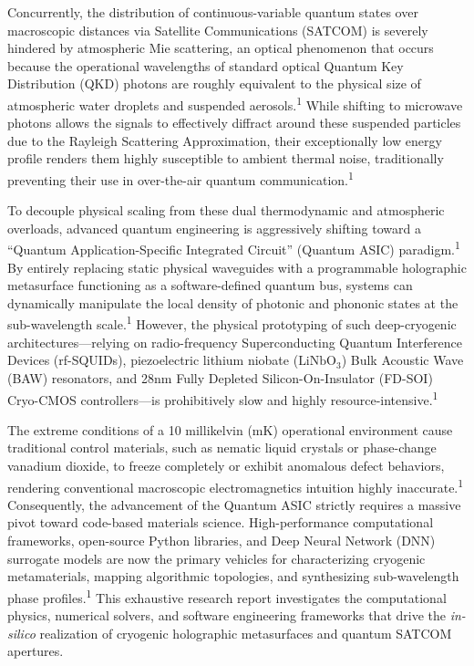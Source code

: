 \documentclass[11pt, a4paper]{article}
\begin{document}
Concurrently, the distribution of continuous-variable quantum states over macroscopic distances via Satellite Communications (SATCOM) is severely hindered by atmospheric Mie scattering, an optical phenomenon that occurs because the operational wavelengths of standard optical Quantum Key Distribution (QKD) photons are roughly equivalent to the physical size of atmospheric water droplets and suspended aerosols.\textsuperscript{1} While shifting to microwave photons allows the signals to effectively diffract around these suspended particles due to the Rayleigh Scattering Approximation, their exceptionally low energy profile renders them highly susceptible to ambient thermal noise, traditionally preventing their use in over-the-air quantum communication.\textsuperscript{1}

To decouple physical scaling from these dual thermodynamic and atmospheric overloads, advanced quantum engineering is aggressively shifting toward a ``Quantum Application-Specific Integrated Circuit'' (Quantum ASIC) paradigm.\textsuperscript{1} By entirely replacing static physical waveguides with a programmable holographic metasurface functioning as a software-defined quantum bus, systems can dynamically manipulate the local density of photonic and phononic states at the sub-wavelength scale.\textsuperscript{1} However, the physical prototyping of such deep-cryogenic architectures---relying on radio-frequency Superconducting Quantum Interference Devices (rf-SQUIDs), piezoelectric lithium niobate ($\text{LiNbO}_3$) Bulk Acoustic Wave (BAW) resonators, and 28nm Fully Depleted Silicon-On-Insulator (FD-SOI) Cryo-CMOS controllers---is prohibitively slow and highly resource-intensive.\textsuperscript{1}

The extreme conditions of a 10 millikelvin (mK) operational environment cause traditional control materials, such as nematic liquid crystals or phase-change vanadium dioxide, to freeze completely or exhibit anomalous defect behaviors, rendering conventional macroscopic electromagnetics intuition highly inaccurate.\textsuperscript{1} Consequently, the advancement of the Quantum ASIC strictly requires a massive pivot toward code-based materials science. High-performance computational frameworks, open-source Python libraries, and Deep Neural Network (DNN) surrogate models are now the primary vehicles for characterizing cryogenic metamaterials, mapping algorithmic topologies, and synthesizing sub-wavelength phase profiles.\textsuperscript{1} This exhaustive research report investigates the computational physics, numerical solvers, and software engineering frameworks that drive the \textit{in-silico} realization of cryogenic holographic metasurfaces and quantum SATCOM apertures.
\end{document}
